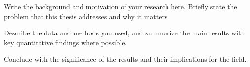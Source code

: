 Write the background and motivation of your research here. Briefly state the problem that this thesis addresses and why it matters.

Describe the data and methods you used, and summarize the main results with key quantitative findings where possible.

Conclude with the significance of the results and their implications for the field.
